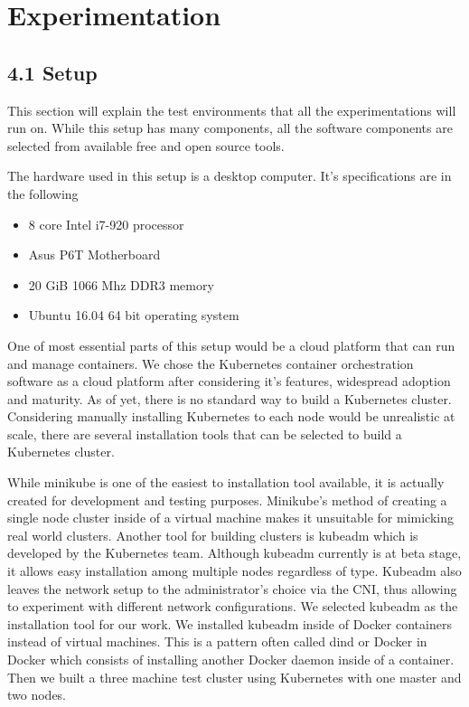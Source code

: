 \documentclass[12pt,oneandhalf,chaparabic,ceng,ms,eng,oneside,pntc]{gsufbe}
\begin{document}

\chapter{Experimentation}
\section[Setup]{4.1 Setup}
This section will explain the test environments that all the experimentations will run on.  While this
setup has many components, all the software components are selected from available free and open source
tools.

The hardware used in this setup is a desktop computer.  It's specifications are in the following
\begin{itemize}
 \item 8 core Intel i7-920 processor
 \item Asus P6T Motherboard
 \item 20 GiB 1066 Mhz DDR3 memory
 \item Ubuntu 16.04 64 bit operating system
\end{itemize}

One of most essential parts of this setup would be a cloud platform that can run and manage containers.
We chose the Kubernetes container orchestration software as a cloud platform after considering it's
features, widespread adoption and maturity.  As of yet, there is no standard way to build a Kubernetes
cluster.  Considering manually installing Kubernetes to each node would be unrealistic at scale, there
are several installation tools that can be selected to build a Kubernetes cluster.

While minikube is one of the easiest to installation tool available, it is actually created for 
development and testing purposes.  Minikube's method of creating a single node
cluster inside of a virtual machine makes it unsuitable for mimicking real world clusters.  Another
tool for building clusters is kubeadm which is developed by the Kubernetes team.  Although kubeadm currently
is at beta stage, it allows easy installation among multiple nodes regardless of type. Kubeadm also leaves the
network setup to the administrator's choice via the CNI, thus allowing to experiment with different
network configurations. We selected kubeadm as the 
installation tool for our work.  We installed kubeadm inside of Docker containers instead of virtual
machines.  This is a pattern often called dind or Docker in Docker which consists of installing
another Docker daemon inside of a container. Then we built a three machine test cluster using Kubernetes with one
master and two nodes.
\end{document}
